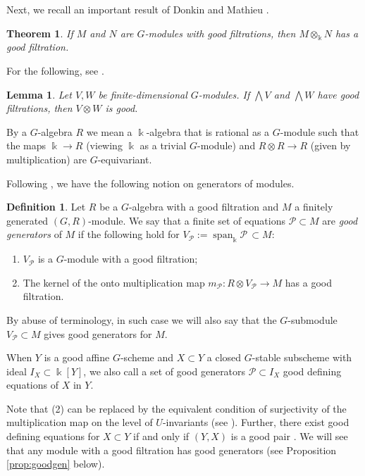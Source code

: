 \documentclass[11pt]{amsart}
\numberwithin{equation}{section}
\newtheorem{theorem}[equation]{Theorem}
\newtheorem{lemma}[equation]{Lemma}
\theoremstyle{definition}
\newtheorem{defn}[equation]{Definition}
\newcommand{\op}{\operatorname}
\newcommand{\oo}{\otimes}
\newcommand{\mc}{\mathcal}
\newcommand{\kk}{\Bbbk}
\begin{document}
Next, we recall an important result of Donkin \cite{donkin} and Mathieu \cite[Theorem 1]{mathieu}.

\begin{theorem}\label{thm:mathieu}
If $M$ and $N$ are $G$-modules with good filtrations, then $M\otimes_\kk N$ has a good filtration.
\end{theorem}

For the following, see \cite[Section 4]{andjan}.

\begin{lemma}\label{lem:good}
Let $V,W$ be finite-dimensional $G$-modules. If $\bigwedge V$ and $ \bigwedge W$ have good filtrations, then $V\otimes W$ is good.
\end{lemma}

\smallskip

By a $G$-algebra $R$ we mean a $\kk$-algebra that is rational as a $G$-module such that the maps $\kk \to R$ (viewing $\kk$ as a trivial $G$-module) and $R \oo R \to R$ (given by multiplication) are $G$-equivariant. 

\smallskip


Following \cite[Definition 2.13]{me}, we have the following notion on generators of modules.

\begin{defn}\label{def:goodgen}
Let $R$ be a $G$-algebra with a good filtration and $M$ a finitely generated $(G,R)$-module. We say that a finite set of equations $\mc{P} \subset M$ are \textit{good generators} of $M$ if the following hold for $V_{\mc{P}} := \op{span}_{\kk} \mc{P}  \, \subset M$:
\begin{enumerate}
\item $V_{\mc{P}}$ is a $G$-module with a good filtration;
\item The kernel of the onto multiplication map $m_{\mc{P}}: R \oo V_{\mc{P}} \to M$ has a good filtration.
\end{enumerate}
By abuse of terminology, in such case we will also say that the $G$-submodule  $V_{\mc{P}} \subset M$ gives good generators for $M$.

When $Y$ is a good affine $G$-scheme and $X\subset Y$ a closed $G$-stable subscheme with ideal $I_X \subset \kk[Y]$, we also call a set of good generators $\mc{P} \subset I_X$ good defining equations of $X$ in $Y$.
\end{defn}

\medskip

Note that (2) can be replaced by the equivalent condition of surjectivity of the multiplication map on the level of $U$-invariants (see \cite[Section 2.4]{me}). Further, there exist good defining equations for $X\subset Y$ if and only if $(Y,X)$ is a good pair \cite[Lemma 2.14]{me}. We will see that any module with a good filtration has good generators (see Proposition \ref{prop:goodgen} below).
\end{document}

